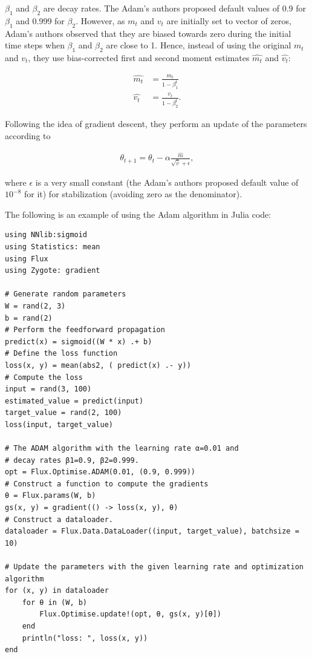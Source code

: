 \documentclass[
	parskip, 			   %
	twoside, 			   %
	DIV=14, 			   %
	BCOR=15.0mm, 		   %
	headsepline, 		   %
	open=right, 		   %
	captions=tableheading, %
	bibliography=totoc,    %
	numbers=noenddot       %
]{scrreprt}
\begin{document}
$\beta_1$ and $\beta_2$ are decay rates. The Adam's authors proposed default values of 0.9 for $\beta_1$ and 0.999 for $\beta_2$. However, as $m_t$ and $v_t$ are initially set to vector of zeros, Adam's authors observed that they are biased towards zero during the initial time steps when $\beta_1$ and $\beta_2$ are close to 1. Hence, instead of using the original $m_t$ and $v_t$, they use bias-corrected first and second moment estimates $\hat{m_t}$ and $\hat{v_t}$:

\begin{equation}
    \label{eq:corrected_moment_estimate}
    \begin{aligned}
        \hat{m_t} &= \frac{m_t}{1-\beta_1^t}
        \\
        \hat{v_t} &= \frac{v_t}{1-\beta_2^t}.
    \end{aligned}
\end{equation}

Following the idea of gradient descent, they perform an update of the parameters according to

\begin{equation}
    \label{eq:Adam_GD}
    \begin{aligned}
        \theta_{t+1} = \theta_{t} - \alpha \frac{\hat{m}}{\sqrt{\hat{v}} + \epsilon},
    \end{aligned}
\end{equation}

where $\epsilon$ is a very small constant (the Adam's authors proposed default value of $10^{-8}$ for it) for stabilization (avoiding zero as the denominator). 

The following is an example of using the Adam algorithm in Julia code:

\begin{verbatim}
using NNlib:sigmoid
using Statistics: mean
using Flux
using Zygote: gradient

# Generate random parameters
W = rand(2, 3)
b = rand(2)
# Perform the feedforward propagation
predict(x) = sigmoid((W * x) .+ b)
# Define the loss function
loss(x, y) = mean(abs2, ( predict(x) .- y))
# Compute the loss
input = rand(3, 100)
estimated_value = predict(input)
target_value = rand(2, 100)
loss(input, target_value)

# The ADAM algorithm with the learning rate α=0.01 and 
# decay rates β1=0.9, β2=0.999.
opt = Flux.Optimise.ADAM(0.01, (0.9, 0.999))
# Construct a function to compute the gradients
θ = Flux.params(W, b)
gs(x, y) = gradient(() -> loss(x, y), θ)
# Construct a dataloader.
dataloader = Flux.Data.DataLoader((input, target_value), batchsize = 10)

# Update the parameters with the given learning rate and optimization algorithm
for (x, y) in dataloader
    for θ in (W, b) 
        Flux.Optimise.update!(opt, θ, gs(x, y)[θ])
    end
    println("loss: ", loss(x, y))
end
\end{verbatim}
\end{document}
